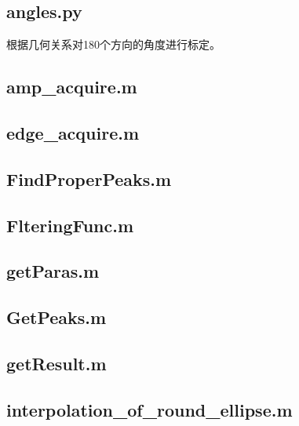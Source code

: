 \documentclass[withoutpreface,bwprint]{cumcmthesis} %
\begin{document}
  \subsection{angles.py}
    根据几何关系对180个方向的角度进行标定。
    
  \subsection{amp\_acquire.m}
    
  \subsection{edge\_acquire.m}
    
  \subsection{FindProperPeaks.m}
    
  \subsection{FlteringFunc.m}
    
  \subsection{getParas.m}
    
  \subsection{GetPeaks.m}
    
  \subsection{getResult.m}
    
  \subsection{interpolation\_of\_round\_ellipse.m}
    
\end{document}
